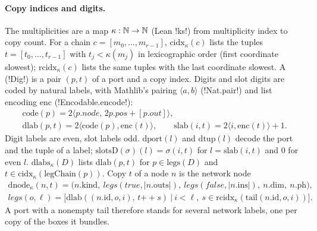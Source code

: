 \paragraph{Copy indices and digits.} The multiplicities are a map $\kappa:\mathbb{N}\to\mathbb{N}$ (Lean \lean!ks!) from multiplicity index to copy count. For a chain $c=[m_0,\dots,m_{r-1}]$, $\mathrm{cidx}_\kappa(c)$ lists the tuples $t=[t_0,\dots,t_{r-1}]$ with $t_j<\kappa(m_j)$ in lexicographic order (first coordinate slowest); $\mathrm{rcidx}_\kappa(c)$ lists the same tuples with the last coordinate slowest. A  (\lean!Dig!) is a pair $(p,t)$ of a port and a copy index. Digits and slot digits are coded by natural labels, with Mathlib's pairing $\langle a,b\rangle$ (\lean!Nat.pair!) and list encoding $\mathrm{enc}$ (\lean!Encodable.encode!):
\begin{gather*}
\mathrm{code}(p)=2\langle p.\mathit{node},\,2p.\mathit{pos}+[p.\mathit{out}]\rangle,\\
\mathrm{dlab}(p,t)=2\langle\mathrm{code}(p),\mathrm{enc}(t)\rangle,\qquad \mathrm{slab}(i,t)=2\langle i,\mathrm{enc}(t)\rangle+1 .
\end{gather*}
Digit labels are even, slot labels odd. $\mathrm{dport}(l)$ and $\mathrm{dtup}(l)$ decode the port and the tuple of a label; $\mathrm{slotsD}(\sigma)(l)=\sigma(i,t)$ for $l=\mathrm{slab}(i,t)$ and $0$ for even $l$. $\mathrm{dlabs}_\kappa(D)$ lists $\mathrm{dlab}(p,t)$ for $p\in\mathrm{legs}(D)$ and $t\in\mathrm{cidx}_\kappa(\mathrm{legChain}(p))$. Copy $t$ of a node $n$ is the network node
\begin{gather*}
\mathrm{dnode}_\kappa(n,t)=\bigl(n.\mathrm{kind},\ \mathit{legs}(\mathit{true},|n.\mathrm{outs}|),\ \mathit{legs}(\mathit{false},|n.\mathrm{ins}|),\ n.\mathrm{dim},\ n.\mathrm{ph}\bigr),\\
\mathit{legs}(o,\ell)=\bigl[\mathrm{dlab}((n.\mathrm{id},o,i),\,t\mathbin{+\!\!+}s)\ \big|\ i<\ell,\ s\in\mathrm{rcidx}_\kappa(\mathrm{tail}(n.\mathrm{id},o,i))\bigr].
\end{gather*}
A port with a nonempty tail therefore stands for several network labels, one per copy of the boxes it bundles.

